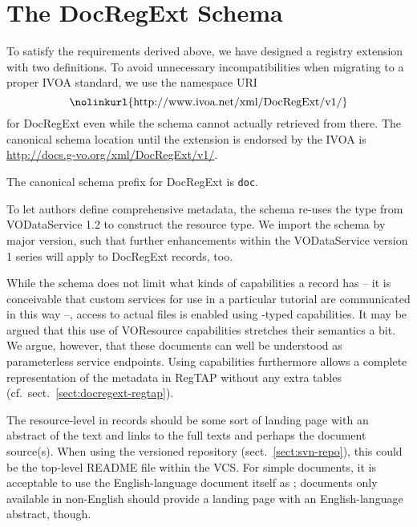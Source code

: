 \documentclass{ivoa}
\begin{document}
\section{The DocRegExt Schema}


\label{sect:regext}

To satisfy the requirements derived above, we have designed a registry extension with
two definitions.
To avoid unnecessary incompatibilities when migrating to a proper IVOA
standard, we use the namespace URI
$$\hbox{\nolinkurl{http://www.ivoa.net/xml/DocRegExt/v1/}}$$
for DocRegExt even while the schema cannot actually retrieved from
there.  The canonical schema location until the extension is endorsed by
the IVOA is \url{http://docs.g-vo.org/xml/DocRegExt/v1/}.

The canonical schema prefix for DocRegExt is \texttt{doc}.

To let authors define comprehensive metadata, the schema
re-uses the  type
from VODataService 1.2 \citep{2021ivoa.spec.1102D} to construct
the  resource type.  We import the schema by major
version, such that further enhancements within the VODataService version
1 series will apply to DocRegExt records, too.

While the schema does not limit what kinds of capabilities a
 record has -- it is conceivable that custom
services for use in a particular tutorial
are communicated in this way --, access to actual files is
enabled using -typed capabilities.  It may be
argued that this use of VOResource capabilities stretches their
semantics a bit.  We argue, however, that these documents can well be
understood as parameterless service endpoints.  Using capabilities
furthermore allows a complete representation of the metadata in RegTAP
without any extra tables (cf.~sect.~\ref{sect:docregext-regtap}).

The resource-level  in  records should
be some sort of landing page with an abstract of the text and links to
the full texts and perhaps the document source(s).  When using the
versioned repository (sect.~\ref{sect:svn-repo}), this could be the
top-level README file within the VCS.  For simple documents, it is
acceptable to use the English-language document itself as
; documents only available in non-English should
provide a landing page with an English-language abstract, though.
\end{document}
